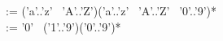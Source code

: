 {\begin{minipage}[c]{6 in}
 := ('a'..'z'  \vline~'A'..'Z')('a'..'z' \vline~'A'..'Z' \vline~'0'..'9')*\\
 := '0'  \vline~('1'..'9')('0'..'9')*\\

\end{minipage}
}

